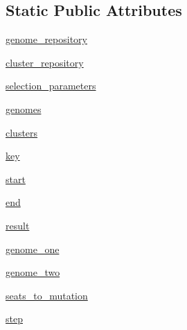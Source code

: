\subsection*{Static Public Attributes}
\begin{DoxyCompactItemize}
\item 
\hyperlink{classNEAT__PyGenetics_1_1NEAT_1_1Analyst_1_1GenomeSelector_1_1GenomeSelector_aabb39abd6a1fcfa61f9b8eb4662e00db}{genome\+\_\+repository}
\item 
\hyperlink{classNEAT__PyGenetics_1_1NEAT_1_1Analyst_1_1GenomeSelector_1_1GenomeSelector_ad3561e93fc8fdd2c51ffec388ddc4c7e}{cluster\+\_\+repository}
\item 
\hyperlink{classNEAT__PyGenetics_1_1NEAT_1_1Analyst_1_1GenomeSelector_1_1GenomeSelector_af6ab170d7eef08b15d79eabb074ade5e}{selection\+\_\+parameters}
\item 
\hyperlink{classNEAT__PyGenetics_1_1NEAT_1_1Analyst_1_1GenomeSelector_1_1GenomeSelector_affce7cea247dd2a869d83fbcc67f9f78}{genomes}
\item 
\hyperlink{classNEAT__PyGenetics_1_1NEAT_1_1Analyst_1_1GenomeSelector_1_1GenomeSelector_a65680f48e6b7e8f218f8536420a665db}{clusters}
\item 
\hyperlink{classNEAT__PyGenetics_1_1NEAT_1_1Analyst_1_1GenomeSelector_1_1GenomeSelector_a59881db1a9d315dd4019aad7d52eeeb2}{key}
\item 
\hyperlink{classNEAT__PyGenetics_1_1NEAT_1_1Analyst_1_1GenomeSelector_1_1GenomeSelector_a41d6d1538df7134f2f31519ff49f6c58}{start}
\item 
\hyperlink{classNEAT__PyGenetics_1_1NEAT_1_1Analyst_1_1GenomeSelector_1_1GenomeSelector_a9531d1391e7501950602af5dd854a43a}{end}
\item 
\hyperlink{classNEAT__PyGenetics_1_1NEAT_1_1Analyst_1_1GenomeSelector_1_1GenomeSelector_af361031b936449d59bedda05b9363d13}{result}
\item 
\hyperlink{classNEAT__PyGenetics_1_1NEAT_1_1Analyst_1_1GenomeSelector_1_1GenomeSelector_afa3ff139e2ad867f5746aee243fd9aa1}{genome\+\_\+one}
\item 
\hyperlink{classNEAT__PyGenetics_1_1NEAT_1_1Analyst_1_1GenomeSelector_1_1GenomeSelector_a8ea3993f52a51fe0d93b331eb2b78a8d}{genome\+\_\+two}
\item 
\hyperlink{classNEAT__PyGenetics_1_1NEAT_1_1Analyst_1_1GenomeSelector_1_1GenomeSelector_a22cb93426797917839ba925a79e51a36}{seats\+\_\+to\+\_\+mutation}
\item 
\hyperlink{classNEAT__PyGenetics_1_1NEAT_1_1Analyst_1_1GenomeSelector_1_1GenomeSelector_af8c8af7836b5ae5b52f6688c1266bb06}{step}

\end{DoxyCompactItemize}
